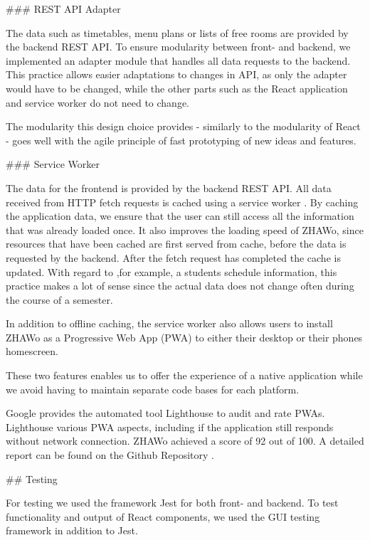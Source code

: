 \begin{markdown}
\bigskip

### REST API Adapter

The data such as timetables, menu plans or lists of free rooms are provided by the backend REST API. To ensure modularity between front- and backend, we implemented an adapter module that handles all data requests to the backend. This practice allows easier adaptations to changes in API, as only the adapter would have to be changed, while the other parts such as the React application and service worker do not need to change.

The modularity this design choice provides - similarly to the modularity of React - goes well with the agile principle of fast prototyping of new ideas and features.

### Service Worker

The data for the frontend is provided by the backend REST API. All data received from HTTP fetch requests is cached using a service worker \cite{ServiceWorker}. By caching the application data, we ensure that the user can still access all the information that was already loaded once. It also improves the loading speed of ZHAWo, since resources that have been cached are first served from cache, before the data is requested by the backend. After the fetch request has completed the cache is updated. With regard to ,for example, a students schedule information, this practice makes a lot of sense since the actual data does not change often during the course of a semester.

In addition to offline caching, the service worker also allows users to install ZHAWo as a Progressive Web App (PWA) \cite{WhatIsPWA} to either their desktop or their phones homescreen.

These two features enables us to offer the experience of a native application while we avoid having to maintain separate code bases for each platform.

Google provides the automated tool Lighthouse \cite{Lighthouse} to audit and rate PWAs. Lighthouse various PWA aspects, including if the application still responds without network connection. ZHAWo achieved a score of 92 out of 100. A detailed report can be found on the Github Repository \cite{OurGithub}.

## Testing

For testing we used the framework Jest \cite{Jest} for both front- and backend. To test functionality and output of React components, we used the GUI testing framework \cite{Enzyme} in addition to Jest.


\end{markdown}
